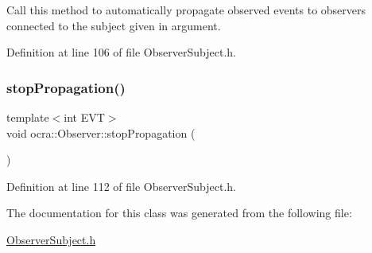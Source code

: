 Call this method to automatically propagate observed events to observers connected to the subject given in argument. 



Definition at line 106 of file Observer\+Subject.\+h.

\hypertarget{classocra_1_1Observer_aa553cb069d393b84ec769f9f6367e1e3}{}\label{classocra_1_1Observer_aa553cb069d393b84ec769f9f6367e1e3} 
\subsubsection{\texorpdfstring{stop\+Propagation()}{stopPropagation()}}
{\footnotesize\ttfamily template$<$int E\+VT$>$ \\
void ocra\+::\+Observer\+::stop\+Propagation (\begin{DoxyParamCaption}{ }\end{DoxyParamCaption})\hspace{0.3cm}{\ttfamily [inline]}}



Definition at line 112 of file Observer\+Subject.\+h.



The documentation for this class was generated from the following file\+:\begin{DoxyCompactItemize}
\item 
\hyperlink{ObserverSubject_8h}{Observer\+Subject.\+h}\end{DoxyCompactItemize}
